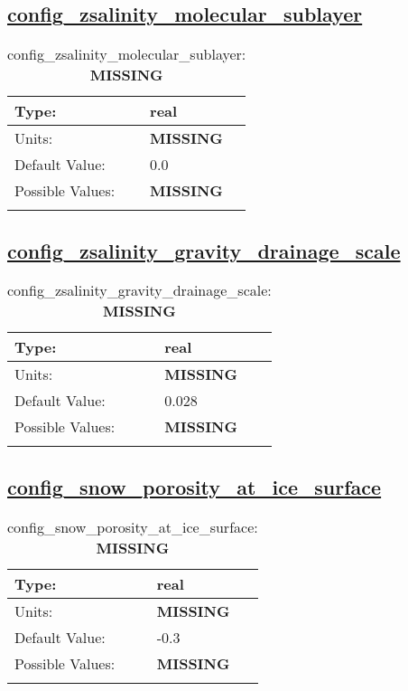 \subsection[config\_zsalinity\_molecular\_sublayer]{\hyperref[sec:nm_tab_biogeochemistry]{config\_zsalinity\_molecular\_sublayer}}
\label{subsec:nm_sec_config_zsalinity_molecular_sublayer}
\begin{center}
\begin{longtable}{| p{2.0in} || p{4.0in} |}
    \hline
    Type: & real \\
    \hline
    Units: & {\bf \color{red} MISSING} \\
    \hline
    Default Value: & 0.0 \\
    \hline
    Possible Values: & {\bf \color{red} MISSING} \\
    \hline
    \caption{config\_zsalinity\_molecular\_sublayer: {\bf \color{red} MISSING}}
\end{longtable}
\end{center}
\subsection[config\_zsalinity\_gravity\_drainage\_scale]{\hyperref[sec:nm_tab_biogeochemistry]{config\_zsalinity\_gravity\_drainage\_scale}}
\label{subsec:nm_sec_config_zsalinity_gravity_drainage_scale}
\begin{center}
\begin{longtable}{| p{2.0in} || p{4.0in} |}
    \hline
    Type: & real \\
    \hline
    Units: & {\bf \color{red} MISSING} \\
    \hline
    Default Value: & 0.028 \\
    \hline
    Possible Values: & {\bf \color{red} MISSING} \\
    \hline
    \caption{config\_zsalinity\_gravity\_drainage\_scale: {\bf \color{red} MISSING}}
\end{longtable}
\end{center}
\subsection[config\_snow\_porosity\_at\_ice\_surface]{\hyperref[sec:nm_tab_biogeochemistry]{config\_snow\_porosity\_at\_ice\_surface}}
\label{subsec:nm_sec_config_snow_porosity_at_ice_surface}
\begin{center}
\begin{longtable}{| p{2.0in} || p{4.0in} |}
    \hline
    Type: & real \\
    \hline
    Units: & {\bf \color{red} MISSING} \\
    \hline
    Default Value: & -0.3 \\
    \hline
    Possible Values: & {\bf \color{red} MISSING} \\
    \hline
    \caption{config\_snow\_porosity\_at\_ice\_surface: {\bf \color{red} MISSING}}
\end{longtable}
\end{center}
